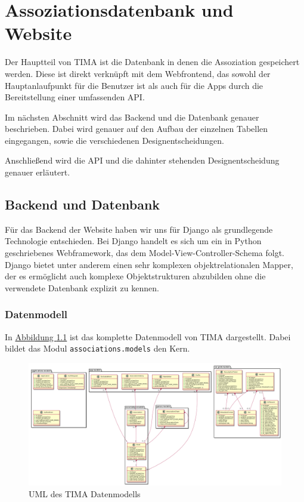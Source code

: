\chapter{Assoziationsdatenbank und Website}
Der Hauptteil von TIMA ist die Datenbank in denen die Assoziation gespeichert werden. Diese ist direkt verknüpft mit dem Webfrontend, das sowohl der Hauptanlaufpunkt für die Benutzer ist als auch für die Apps durch die Bereitstellung einer umfassenden API.

Im nächsten Abschnitt wird das Backend und die Datenbank genauer beschrieben. Dabei wird genauer auf den Aufbau der einzelnen Tabellen eingegangen, sowie die verschiedenen Designentscheidungen.

Anschließend wird die API und die dahinter stehenden Designentscheidung genauer erläutert.

\section{Backend und Datenbank}
Für das Backend der Website haben wir uns für Django als grundlegende Technologie entschieden. Bei Django handelt es sich um ein in Python geschriebenes Webframework, das dem Model-View-Controller-Schema folgt. Django bietet unter anderem einen sehr komplexen objektrelationalen Mapper, der es ermöglicht auch komplexe Objektstrukturen abzubilden ohne die verwendete Datenbank explizit zu kennen.

\subsection{Datenmodell}
In \hyperref[fig:uml]{Abbildung \ref*{fig:uml}} ist das komplette Datenmodell von TIMA dargestellt. Dabei bildet das Modul \texttt{associations.models} den Kern.

\begin{figure}
	\centering
	\includegraphics[width=\textwidth]{images/uml.png}
	\caption{UML des TIMA Datenmodells}
	\label{fig:uml}
\end{figure}

